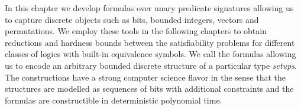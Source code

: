 In this chapter we develop formulas over unary predicate signatures allowing us
to capture discrete objects such as bits, bounded integers, vectors and
permutations.
We employ these tools in the following chapters to obtain reductions and
hardness bounds between the satisfiability problems for different classes of
logics with built-in equivalence symbols.
We call the formulas allowing us to encode an arbitrary bounded discrete
structure of a particular type \emph{setups}.
The constructions have a strong computer science flavor in the sense that the
structures are modelled as sequences of bits with additional constraints and the
formulas are constructible in deterministic polynomial time.

